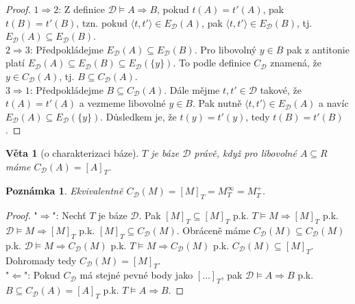 \documentclass{article}
\newtheorem*{remark}{Poznámka}
\newtheorem{theorem}{Věta}
\begin{document}
\begin{proof}
  $1\Rightarrow2$: Z definice $\mathcal{D} \models A \Rightarrow B$,
  pokud $t(A)=t'(A)$, pak $t(B)=t'(B)$, tzn. pokud $\langle t, t'
  \rangle \in E_{\mathcal{D}}(A)$, pak $\langle t, t' \rangle \in
  E_{\mathcal{D}}(B)$, tj. $E_{\mathcal{D}}(A) \subseteq
  E_{\mathcal{D}}(B)$.\\

  $2\Rightarrow3$: Předpokládejme $E_{\mathcal{D}}(A) \subseteq
  E_{\mathcal{D}}(B)$. Pro libovolný $y \in B$ pak z antitonie platí
  $E_{\mathcal{D}}(A) \subseteq E_{\mathcal{D}}(B) \subseteq
  E_{\mathcal{D}}(\{y\})$. To podle definice $C_{\mathcal{D}}$
  znamená, že $y \in C_{\mathcal{D}}(A)$, tj. $B \subseteq
  C_{\mathcal{D}}(A)$.\\

  $3\Rightarrow1$: Předpokládejme $B \subseteq C_{\mathcal{D}}(A)$.
  Dále mějme $t, t'\in \mathcal D$ takové, že $t(A)=t'(A)$ a vezmeme
  libovolné $y \in B$. Pak nutně $\langle t, t' \rangle \in
  E_{\mathcal{D}}(A)$ a navíc $E_{\mathcal{D}}(A) \subseteq
  E_{\mathcal{D}}(\{y\})$. Důsledkem je, že $t(y)=t'(y)$, tedy
  $t(B)=t'(B)$.
\end{proof}

\begin{theorem}[o charakterizaci báze]
  $T$ je báze $\mathcal{D}$ právě, když pro libovolné $A\subseteq R$
  máme $C_{\mathcal{D}}(A)=[A]_T$.
\end{theorem}

\begin{remark}
  Ekvivalentně $C_{\mathcal{D}}(M)=[M]_T = M^{\infty}_T = M^{+}_T$.
\end{remark}

\begin{proof}
  "$\Rightarrow$": Nechť $T$ je báze $\mathcal{D}$. Pak $[M]_T
  \subseteq [M]_T$ p.k. $T \models M \Rightarrow [M]_T$
  p.k. $\mathcal{D} \models M \Rightarrow [M]_T$ p.k. $[M]_T \subseteq
  C_{\mathcal{D}}(M)$. Obráceně máme $C_{\mathcal{D}}(M) \subseteq
  C_{\mathcal{D}}(M)$ p.k. $\mathcal{D} \models M \Rightarrow
  C_{\mathcal{D}}(M)$ p.k. $T \models M \Rightarrow
  C_{\mathcal{D}}(M)$ p.k. $C_{\mathcal{D}}(M) \subseteq [M]_T$.
  Dohromady tedy $C_{\mathcal{D}}(M) =[M]_T$. \\
  
  "$\Leftarrow$": Pokud $C_{\mathcal{D}}$ má stejné pevné body jako
  $[\dots]_T$, pak $\mathcal{D} \models A \Rightarrow B$ p.k. $B
  \subseteq C_{\mathcal{D}}(A) = [A]_T$ p.k. $T \models A \Rightarrow
  B$.
\end{proof}
\end{document}
